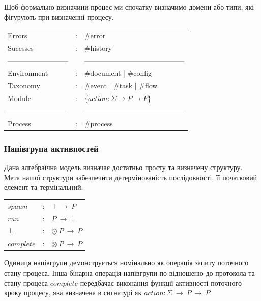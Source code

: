 \documentclass[11pt,oneside]{article}
\begin{document}
   Щоб формально визначини процес ми спочатку визначимо домени або типи,
   які фігурують при визначенні процесу.



\begin{center}
\begin{tabular}{lcl}
                Errors &:& \#error\\
              Sucesses &:& \#history\\
        --------------------------&&------------------------------------------\\
           Environment &:& \#document | \#config\\
              Taxonomy &:& \#event    | \#task   | \#flow\\
                Module &:& $\{ action : \Sigma \rightarrow P \rightarrow P \}$\\
        --------------------------&&------------------------------------------\\
               Process &:& \#process\\
\end{tabular}
\end{center}

\newpage
  \subsubsection*{Напівгрупа активностей}

  Дана алгебраїчна модель визначає достатньо просту та визначену структуру.
  Мета нашої структури забезпечити детермінованість послідовності,
  її початковий елемент та термінальний. 

\begin{center}
\begin{tabular}{lcl}
$spawn$       &:& $\top\ \rightarrow\ P$\\
$run$         &:& $P\ \rightarrow\ \bot$\\
$\bot$        &:& $\odot\ P\ \rightarrow\ P$\\
$complete$    &:& $\otimes\ P\ \rightarrow\ P$\\
\end{tabular}
\end{center}

  Одиниця напівгрупи
  демонструється номінально як операція запиту поточного стану процеса.
  Інша бінарна операція напівгрупи по відношеню до протокола та стану процеса $complete$
  передбачає виконання функції активності поточного кроку процесу, яка
  визначена в сигнатурі як $action: \Sigma\ \rightarrow\ P\ \rightarrow\ P$.
\end{document}
